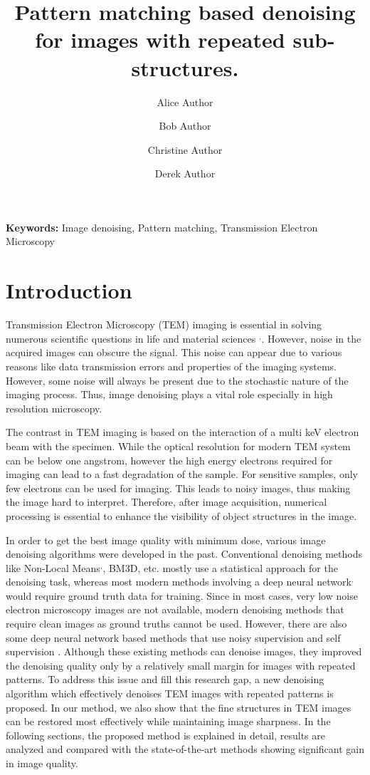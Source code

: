 \documentclass[fleqn,10pt]{wlscirep}
\title{Pattern matching based denoising for images with repeated sub-structures.}
\author[1,*]{Alice Author}
\author[2]{Bob Author}
\author[1,2,+]{Christine Author}
\author[2,+]{Derek Author}
\affil[1]{Affiliation, department, city, postcode, country}
\affil[2]{Affiliation, department, city, postcode, country}
\affil[*]{corresponding.author@email.example}
\affil[+]{these authors contributed equally to this work}
\begin{document}
	
	\maketitle
	
	\noindent
	\textbf{Keywords:} Image denoising, Pattern matching, Transmission Electron Microscopy
	
	\section*{Introduction}
	
	Transmission Electron Microscopy (TEM) imaging is essential in solving numerous scientific questions in life and material sciences \cite{CURRY200691}$^{,}$\cite{WANG2008395}. However, noise in the acquired images can obscure the signal. This noise can appear due to various reasons like data transmission errors and properties of the imaging systems. However, some noise will always be present due to the stochastic nature of the imaging process. Thus, image denoising plays a vital role especially in high resolution microscopy.
	
	The contrast in TEM imaging is based on the interaction of a multi keV electron beam with the specimen. While the optical resolution for modern TEM system can be below one angstrom, however the high energy electrons required for imaging can lead to a fast degradation of the sample. For sensitive samples, only few electrons can be used for imaging. This leads to noisy images, thus making the image hard to interpret. Therefore, after image acquisition, numerical processing is essential to enhance the visibility of object structures in the image.
	
	In order to get the best image quality with minimum dose, various image denoising algorithms were developed in the past. Conventional denoising methods like Non-Local Means\cite{bcm_nlm}$^{,}$, BM3D\cite{DBLP:journals/tip/BM3D}, etc. mostly use a statistical approach for the denoising task, whereas most modern methods involving a deep neural network\cite{zhang2018ffdnet}$^{,}$ \cite{zhang2017beyond} would require ground truth data for training. Since in most cases, very low noise electron microscopy images are not available, modern denoising methods that require clean images as ground truths cannot be used. However, there are also some deep neural network based methods that use noisy supervision\cite{DBLP:journals/corr/abs-1803-04189} and self supervision\cite{krull2019noise2void} . Although these existing methods can denoise images, they improved the denoising quality only by a relatively small margin for images with repeated patterns. To address this issue and fill this research gap, a new denoising algorithm which effectively denoises TEM images with repeated patterns is proposed. In  our method, we also show that the fine structures in TEM images can be restored most effectively while maintaining image sharpness. In the following sections, the proposed method is explained in detail, results are analyzed and compared with the state-of-the-art methods showing significant gain in image quality. 
	
\end{document}
